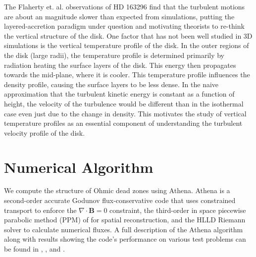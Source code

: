 The Flaherty et. al. observations of HD 163296 find that the turbulent motions are about an magnitude slower than expected from simulations, putting the layered-accretion paradigm under question and motivating theorists to re-think the vertical structure of the disk.   One factor that has not been well studied in 3D simulations is the vertical temperature profile of the disk.  In the outer regions of the disk (large radii), the temperature profile is determined primarily by radiation heating the surface layers of the disk.  This energy then propagates towards the mid-plane, where it is cooler.  This temperature profile influences the density profile, causing the surface layers to be less dense.  In the naive approximation that the turbulent kinetic energy is constant as a function of height, the velocity of the turbulence would be different than in the isothermal case even just due to the change in density.  This motivates the study of vertical temperature profiles as an essential component of understanding the turbulent velocity profile of the disk. 





\section{Numerical Algorithm}
We compute the structure of Ohmic dead zones using {\sc Athena}. {\sc Athena} is a second-order accurate Godunov flux-conservative code that uses constrained transport \cite[CT;][]{evans88} to enforce the $\nabla \cdot \mathbf{B} = 0$ constraint, the
third-order in space piecewise parabolic method (PPM) of \cite{colella84} for spatial reconstruction, and the HLLD Riemann solver \citep{miyoshi05,mignone07} to calculate numerical fluxes.  A full description of the {\sc Athena} algorithm
along with results showing the code's performance on various test problems can be found in \cite{gardiner05}, \cite{gardiner08}, and \cite{stone08}.

